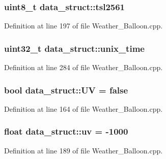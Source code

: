 \subsubsection[{\texorpdfstring{tsl2561}{tsl2561}}]{\setlength{\rightskip}{0pt plus 5cm}uint8\+\_\+t data\+\_\+struct\+::tsl2561}\hypertarget{structdata__struct_a90bedda6c48b7682713ecf7cf7c5c2ca}{}\label{structdata__struct_a90bedda6c48b7682713ecf7cf7c5c2ca}


Definition at line 197 of file Weather\+\_\+\+Balloon.\+cpp.

\subsubsection[{\texorpdfstring{unix\+\_\+time}{unix\_time}}]{\setlength{\rightskip}{0pt plus 5cm}uint32\+\_\+t data\+\_\+struct\+::unix\+\_\+time}\hypertarget{structdata__struct_a37f7a481de32f77f428f03c07d60090e}{}\label{structdata__struct_a37f7a481de32f77f428f03c07d60090e}


Definition at line 284 of file Weather\+\_\+\+Balloon.\+cpp.

\subsubsection[{\texorpdfstring{UV}{UV}}]{\setlength{\rightskip}{0pt plus 5cm}bool data\+\_\+struct\+::\+UV = false}\hypertarget{structdata__struct_a7b1c06118cc557e0b428514c14246726}{}\label{structdata__struct_a7b1c06118cc557e0b428514c14246726}


Definition at line 164 of file Weather\+\_\+\+Balloon.\+cpp.

\subsubsection[{\texorpdfstring{uv}{uv}}]{\setlength{\rightskip}{0pt plus 5cm}float data\+\_\+struct\+::uv = -\/1000}\hypertarget{structdata__struct_a0a895e3ba629b91b7b2de586eb442f60}{}\label{structdata__struct_a0a895e3ba629b91b7b2de586eb442f60}


Definition at line 189 of file Weather\+\_\+\+Balloon.\+cpp.

